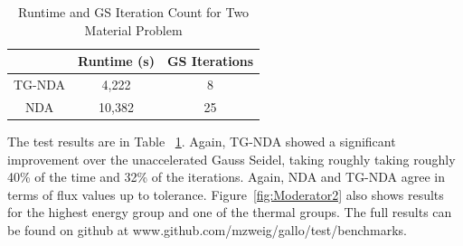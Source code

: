 \begin{table}[!htb]
\centering
\caption{Runtime and GS Iteration Count for Two Material Problem}
    \label{tab:two}
\begin{center}
    \begin{tabular}{|c|c|c|}
    \hline
    & Runtime (s) & GS Iterations \\
    \hline
    TG-NDA & 4,222 & 8 \\
    NDA & 10,382 & 25 \\
    \hline
    \end{tabular}
\end{center}
\end{table}

The test results are in Table ~\ref{tab:two}. Again, TG-NDA showed a significant improvement over the unaccelerated Gauss Seidel, taking roughly taking roughly 40\% of the time and 32\% of the iterations. Again, NDA and TG-NDA agree in terms of flux values up to tolerance.  Figure~\ref{fig:Moderator2} also shows results for the highest energy group and one of the thermal groups. The full results can be found on github at www.github.com/mzweig/gallo/test/benchmarks.


